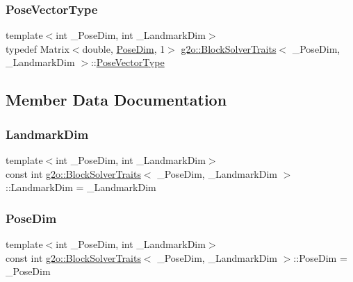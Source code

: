\subsubsection{\texorpdfstring{Pose\+Vector\+Type}{PoseVectorType}}
{\footnotesize\ttfamily template$<$int \+\_\+\+Pose\+Dim, int \+\_\+\+Landmark\+Dim$>$ \\
typedef Matrix$<$double, \mbox{\hyperlink{structg2o_1_1_block_solver_traits_a90a03bcfc60b629da5601f6df9514297}{Pose\+Dim}}, 1$>$ \mbox{\hyperlink{structg2o_1_1_block_solver_traits}{g2o\+::\+Block\+Solver\+Traits}}$<$ \+\_\+\+Pose\+Dim, \+\_\+\+Landmark\+Dim $>$\+::\mbox{\hyperlink{structg2o_1_1_block_solver_traits_a032ed57e9bc44c36093f97b32e1506f6}{Pose\+Vector\+Type}}}



\subsection{Member Data Documentation}
\mbox{\label{structg2o_1_1_block_solver_traits_a7e6e33971e5243e020a9f41cd3182218}} 
\subsubsection{\texorpdfstring{Landmark\+Dim}{LandmarkDim}}
{\footnotesize\ttfamily template$<$int \+\_\+\+Pose\+Dim, int \+\_\+\+Landmark\+Dim$>$ \\
const int \mbox{\hyperlink{structg2o_1_1_block_solver_traits}{g2o\+::\+Block\+Solver\+Traits}}$<$ \+\_\+\+Pose\+Dim, \+\_\+\+Landmark\+Dim $>$\+::Landmark\+Dim = \+\_\+\+Landmark\+Dim\hspace{0.3cm}{\ttfamily [static]}}

\mbox{\label{structg2o_1_1_block_solver_traits_a90a03bcfc60b629da5601f6df9514297}} 
\subsubsection{\texorpdfstring{Pose\+Dim}{PoseDim}}
{\footnotesize\ttfamily template$<$int \+\_\+\+Pose\+Dim, int \+\_\+\+Landmark\+Dim$>$ \\
const int \mbox{\hyperlink{structg2o_1_1_block_solver_traits}{g2o\+::\+Block\+Solver\+Traits}}$<$ \+\_\+\+Pose\+Dim, \+\_\+\+Landmark\+Dim $>$\+::Pose\+Dim = \+\_\+\+Pose\+Dim\hspace{0.3cm}{\ttfamily [static]}}



